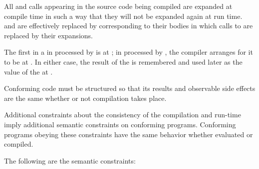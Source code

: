  \itemitem{\bull} All  and  calls
appearing in the source code being compiled are expanded at compile time
in such a way that they will not be expanded again at run time.
 and  are effectively replaced by
 corresponding to their bodies in which calls to 
 are replaced by their expansions.
 
\itemitem{\bull} 
The first  in a   
in  processed by 
is  at ;
in  processed by , the compiler
arranges for it to be  at .
In either case, the result of the 
is remembered and used later as the value of the 
  at .

\endlist
 
\endsubsubsection%



Conforming code must be structured so that its results and observable
side effects are the same whether or not compilation takes place.
 
Additional constraints about the consistency of the compilation and
run-time  imply additional semantic constraints on
conforming programs.  Conforming programs obeying these constraints
have the same behavior whether evaluated or compiled.

The following are the semantic constraints:
 
